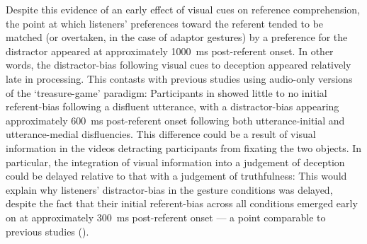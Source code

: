 \documentclass[a4paper,man,natbib]{apa6}
\begin{document}
Despite this evidence of an early effect of visual cues on reference comprehension, the point at which listeners' preferences toward the referent tended to be matched (or overtaken, in the case of adaptor gestures) by a preference for the distractor appeared at approximately 1000~ms post-referent onset. 
In other words, the distractor-bias following visual cues to deception appeared relatively late in processing. %
This contasts with previous studies using audio-only versions of the `treasure-game' paradigm: Participants in \citet{Loy2017} showed little to no initial referent-bias following a disfluent utterance, with a distractor-bias appearing approximately 600~ms post-referent onset following both utterance-initial and utterance-medial disfluencies. 
This difference could be a result of visual information in the videos detracting participants from fixating the two objects. 
In particular, the integration of visual information into a judgement of deception could be delayed relative to that with a judgement of truthfulness: 
This would explain why listeners' distractor-bias in the gesture conditions was delayed, despite the fact that their initial referent-bias across all conditions emerged early on at approximately 300~ms post-referent onset --- a point comparable to previous studies (\citealt{Loy2017, King2018}). 
\end{document}
